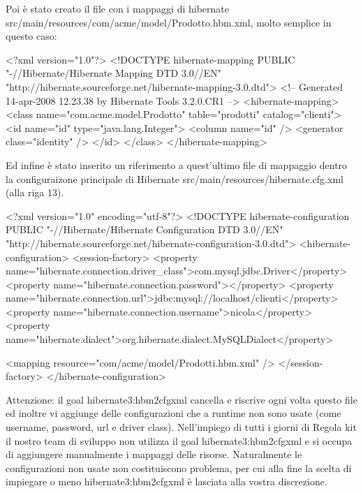Poi è stato creato il file con i mappaggi di hibernate src/main/resources/com/acme/model/Prodotto.hbm.xml, molto semplice in questo caso:

\begin{xml}
<?xml version="1.0"?>
<!DOCTYPE hibernate-mapping PUBLIC "-//Hibernate/Hibernate Mapping DTD 3.0//EN"
"http://hibernate.sourceforge.net/hibernate-mapping-3.0.dtd">
<!-- Generated 14-apr-2008 12.23.38 by Hibernate Tools 3.2.0.CR1 -->
<hibernate-mapping>
    <class name="com.acme.model.Prodotto" table="prodotti" catalog="clienti">
        <id name="id" type="java.lang.Integer">
            <column name="id" />
            <generator class="identity" />
        </id>
    </class>
</hibernate-mapping>
\end{xml}

Ed infine è stato inserito un riferimento a quest'ultimo file di mappaggio dentro la configuraizone principale di Hibernate    src/main/resources/hibernate.cfg.xml (alla riga 13). 

\begin{xml}
<?xml version="1.0" encoding="utf-8"?>
<!DOCTYPE hibernate-configuration PUBLIC
"-//Hibernate/Hibernate Configuration DTD 3.0//EN"
"http://hibernate.sourceforge.net/hibernate-configuration-3.0.dtd">
<hibernate-configuration>
    <session-factory>
        <property name="hibernate.connection.driver_class">com.mysql.jdbc.Driver</property>
        <property name="hibernate.connection.password"></property>
        <property name="hibernate.connection.url">jdbc:mysql://localhost/clienti</property>
        <property name="hibernate.connection.username">nicola</property>
        <property name="hibernate.dialect">org.hibernate.dialect.MySQLDialect</property>
       
       <mapping resource="com/acme/model/Prodotti.hbm.xml" />
    </session-factory>
</hibernate-configuration>
\end{xml}

Attenzione: il goal hibernate3:hbm2cfgxml cancella e riscrive ogni volta questo file ed inoltre vi aggiunge delle configurazioni che a runtime non sono usate (come username, password, url e driver class). Nell'impiego di tutti i giorni di Regola kit il nostro team di sviluppo non utilizza il goal hibernate3:hbm2cfgxml e si occupa di aggiungere manualmente i mappaggi delle risorse. Naturalmente le configurazioni non usate non costituiscono problema, per cui alla fine la scelta di impiegare o meno hibernate3:hbm2cfgxml è lasciata alla vostra discrezione.

